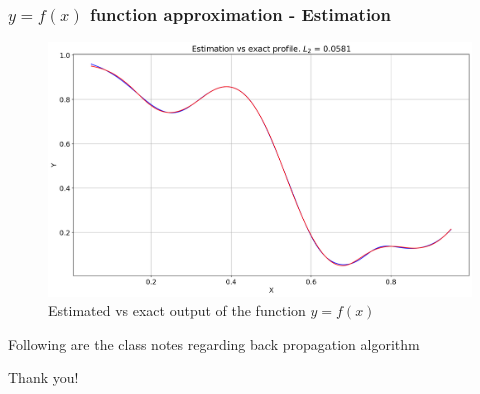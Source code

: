 \begin{frame}
    \frametitle{$y=f(x)$ function approximation - Estimation}
    \begin{figure}
        \center
        \includegraphics[scale=0.33]{supportingFiles/results/prediction_XY.png}
        \caption{Estimated vs exact output of the function $y=f(x)$}
    \end{figure}
\end{frame}

\begin{frame}
   \centering
     Following are the class notes regarding back propagation algorithm
\end{frame}




\begin{frame}
   \centering
     Thank you!
\end{frame}

